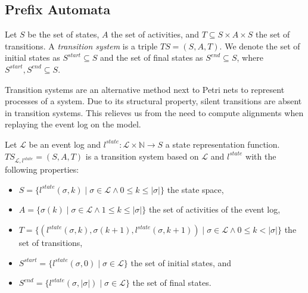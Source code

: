\subsection{Prefix Automata} \label{subsec:transition_systems}

\begin{definition}
    Let $S$ be the set of states, $A$ the set of activities, and $T \subseteq S \times A \times S$ the set of transitions. A \emph{transition system} is a triple $\mathit{\mathit{TS}} = (S, A, T)$. We denote the set of initial states as $S^{start} \subseteq S$ and the set of final states as $S^{end} \subseteq S$, where $S^{start}, S^{end} \subseteq S$.
\end{definition}

Transition systems are an alternative method next to Petri nets to represent processes of a system. Due to its structural property, silent transitions are absent in transition systems. This relieves us from the need to compute alignments when replaying the event log on the model.

\begin{definition}\label{def:pa}

    Let $\mathcal{L}$ be an event log and $l^{state} \colon \mathcal{L} \times \mathbb{N} \rightarrow S$ a state representation function. $\mathit{TS}_{\mathcal{L}, l^{state}} = (S, A, T)$ is a transition system based on $\mathcal{L}$ and $l^{state}$ with the following properties:
    
    \begin{itemize}
        \item $S = \{l^{state}(\sigma, k) \mid \sigma \in \mathcal{L} \land 0 \leq k \leq \lvert \sigma \rvert \}$ the state space,
        \item $A = \{ \sigma(k) \mid \sigma \in \mathcal{L} \land 1 \leq k \leq \lvert \sigma \rvert \}$ the set of activities of the event log,
        \item $T = \{ (l^{state}(\sigma, k), \sigma(k+1), l^{state}(\sigma, k+1)) \mid \sigma \in \mathcal{L} \land 0 \leq k < \lvert \sigma \rvert \}$ the set of transitions,
        \item $S^{start} = \{ l^{state}(\sigma, 0) \mid \sigma \in \mathcal{L} \}$ the set of initial states, and
        \item $S^{end} = \{ l^{state}(\sigma, \lvert \sigma \rvert) \mid \sigma \in \mathcal{L} \}$ the set of final states.
    \end{itemize} 

\end{definition}

